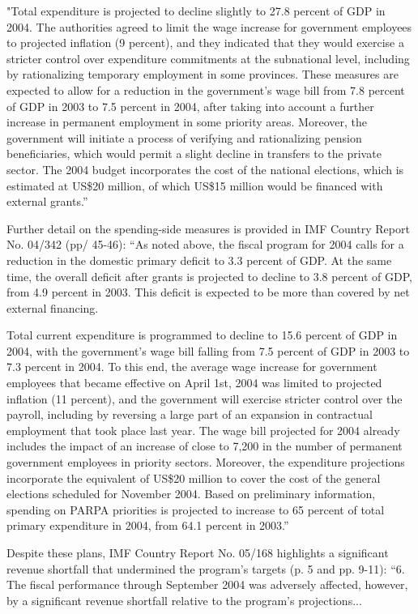 "Total expenditure is projected to decline slightly to 27.8 percent of GDP in 2004. The authorities agreed to limit the wage increase for government employees to projected inflation (9 percent), and they indicated that they would exercise a stricter control over expenditure commitments at the subnational level, including by rationalizing temporary employment in some provinces. These measures are expected to allow for a reduction in the government's wage bill from 7.8 percent of GDP in 2003 to 7.5 percent in 2004, after taking into account a further increase in permanent employment in some priority areas. Moreover, the government will initiate a process of verifying and rationalizing pension beneficiaries, which would permit a slight decline in transfers to the private sector. The 2004 budget incorporates the cost of the national elections, which is estimated at US\$20 million, of which US\$15 million would be financed with external grants.”

Further detail on the spending-side measures is provided in IMF Country Report No. 04/342 (pp/ 45-46): “As noted above, the fiscal program for 2004 calls for a reduction in the domestic primary deficit to 3.3 percent of GDP. At the same time, the overall deficit after grants is projected to decline to 3.8 percent of GDP, from 4.9 percent in 2003. This deficit is expected to be more than covered by net external financing.

Total current expenditure is programmed to decline to 15.6 percent of GDP in 2004, with the government’s wage bill falling from 7.5 percent of GDP in 2003 to 7.3 percent in 2004. To this end, the average wage increase for government employees that became effective on April 1st, 2004 was limited to projected inflation (11 percent), and the government will exercise stricter control over the payroll, including by reversing a large part of an expansion in contractual employment that took place last year. The wage bill projected for 2004 already includes the impact of an increase of close to 7,200 in the number of permanent government employees in priority sectors. Moreover, the expenditure projections incorporate the equivalent of US\$20 million to cover the cost of the general elections scheduled for November 2004. Based on preliminary information, spending on PARPA priorities is projected to increase to 65 percent of total primary expenditure in 2004, from 64.1 percent in 2003.”

Despite these plans, IMF Country Report No. 05/168 highlights a significant revenue shortfall that undermined the program’s targets (p. 5 and pp. 9-11): “6. The fiscal performance through September 2004 was adversely affected, however, by a significant revenue shortfall relative to the program’s projections...

